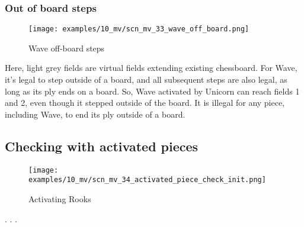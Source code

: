\clearpage %

\subsubsection*{Out of board steps}

\vspace*{-2.9ex} %
\noindent
\begin{figure}[!h]
\texttt{[image: examples/10\_mv/scn\_mv\_33\_wave\_off\_board.png]}
\caption{Wave off-board steps}
\label{fig:scn_mv_33_wave_off_board}
\end{figure}

Here, light grey fields are virtual fields extending existing chessboard.
For Wave, it's legal to step outside of a board, and all subsequent steps
are also legal, as long as its ply ends on a board. So, Wave activated by
Unicorn can reach fields 1 and 2, even though it stepped outside of the
board. It is illegal for any piece, including Wave, to end its ply outside
of a board.

\clearpage %

\subsection*{Checking with activated pieces}

\vspace*{-2.9ex} %
\noindent
\begin{figure}[!h]
\texttt{[image: examples/10\_mv/scn\_mv\_34\_activated\_piece\_check\_init.png]}
\caption{Activating Rooks}
\label{fig:scn_mv_34_activated_piece_check_init}
\end{figure}

. . .

\clearpage %

